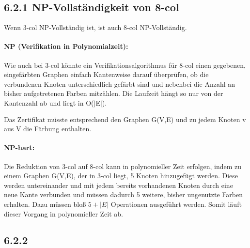 \subsection*{6.2.1 NP-Vollständigkeit von 8-col}

Wenn 3-col NP-Vollständig ist, ist auch 8-col NP-Vollständig.

\paragraph{NP (Verifikation in Polynomialzeit):}

Wie auch bei 3-col könnte ein Verifikationsalgorithmus für 8-col einen gegebenen, eingefärbten Graphen einfach Kantenweise darauf überprüfen, ob die verbundenen Knoten unterschiedlich gefärbt sind und nebenbei die Anzahl an bisher aufgetretenen Farben mitzählen. Die Laufzeit hängt so nur von der Kantenzahl ab und liegt in O($|$E$|$).

Das Zertifikat müsste entsprechend den Graphen G(V,E) und zu jedem Knoten v aus V die Färbung enthalten.

\paragraph{NP-hart:}

Die Reduktion von 3-col auf 8-col kann in polynomieller Zeit erfolgen, indem zu einem Graphen G(V,E), der in 3-col liegt, 5 Knoten hinzugefügt werden. Diese werden untereinander und mit jedem bereits vorhandenen Knoten durch eine neue Kante verbunden und müssen dadurch 5 weitere, bisher ungenutzte Farben erhalten. Dazu müssen bloß $5 + |E|$ Operationen ausgeführt werden. Somit läuft dieser Vorgang in polynomieller Zeit ab.

\subsection*{6.2.2 }

